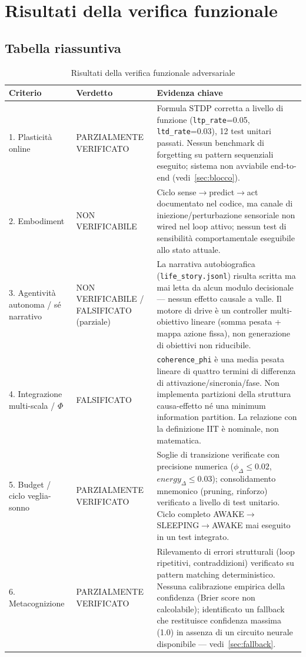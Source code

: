 \documentclass[11pt,a4paper]{article}
\newcommand{\code}[1]{\texttt{#1}}
\newcommand{\coherencephi}{\code{coherence\_phi}}
\begin{document}
\section{Risultati della verifica funzionale}
\label{sec:results}

\subsection{Tabella riassuntiva}

\begin{table}[h]
\centering
\caption{Risultati della verifica funzionale adversariale}
\label{tab:verdetti}
\begin{tabular}{p{3cm}p{2.5cm}p{8cm}}
\toprule
\textbf{Criterio} & \textbf{Verdetto} & \textbf{Evidenza chiave} \\
\midrule
1. Plasticit\`a online & PARZIALMENTE VERIFICATO & Formula STDP corretta a livello di funzione (\code{ltp\_rate}=0.05, \code{ltd\_rate}=0.03), 12 test unitari passati. Nessun benchmark di forgetting su pattern sequenziali eseguito; sistema non avviabile end-to-end (vedi~\ref{sec:blocco}). \\
2. Embodiment & NON VERIFICABILE & Ciclo sense$\to$predict$\to$act documentato nel codice, ma canale di iniezione/perturbazione sensoriale non wired nel loop attivo; nessun test di sensibilit\`a comportamentale eseguibile allo stato attuale. \\
3. Agentivit\`a autonoma / s\'e narrativo & NON VERIFICABILE / FALSIFICATO (parziale) & La narrativa autobiografica (\code{life\_story.jsonl}) risulta scritta ma mai letta da alcun modulo decisionale --- nessun effetto causale a valle. Il motore di drive \`e un controller multi-obiettivo lineare (somma pesata + mappa azione fissa), non generazione di obiettivi non riducibile. \\
4. Integrazione multi-scala / $\Phi$ & FALSIFICATO & \coherencephi{} \`e una media pesata lineare di quattro termini di differenza di attivazione/sincronia/fase. Non implementa partizioni della struttura causa-effetto n\'e una minimum information partition. La relazione con la definizione IIT \`e nominale, non matematica. \\
5. Budget / ciclo veglia-sonno & PARZIALMENTE VERIFICATO & Soglie di transizione verificate con precisione numerica ($\phi_{\Delta} \leq 0.02$, $energy_{\Delta} \leq 0.03$); consolidamento mnemonico (pruning, rinforzo) verificato a livello di test unitario. Ciclo completo AWAKE$\to$SLEEPING$\to$AWAKE mai eseguito in un test integrato. \\
6. Metacognizione & PARZIALMENTE VERIFICATO & Rilevamento di errori strutturali (loop ripetitivi, contraddizioni) verificato su pattern matching deterministico. Nessuna calibrazione empirica della confidenza (Brier score non calcolabile); identificato un fallback che restituisce confidenza massima (1.0) in assenza di un circuito neurale disponibile --- vedi~\ref{sec:fallback}. \\
\bottomrule
\end{tabular}
\end{table}
\end{document}
